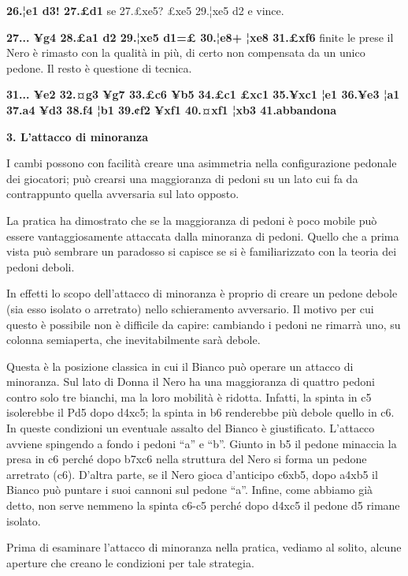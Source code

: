 \textbf{26.¦e1 d3! 27.£d1} se 27.£xe5? £xe5 29.¦xe5 d2 e vince.

\textbf{27... ¥g4 28.£a1 d2 29.¦xe5 d1=£ 30.¦e8+ ¦xe8 31.£xf6} finite le
prese il Nero è rimasto con la qualità in più, di certo non compensata
da un unico pedone. Il resto è questione di tecnica.

\textbf{31... ¥e2 32.¤g3 ¥g7 33.£c6 ¥b5 34.£c1 £xc1 35.¥xc1 ¦e1 36.¥e3
¦a1 37.a4 ¥d3 38.f4 ¦b1 39.¢f2 ¥xf1 40.¤xf1 ¦xb3 41.abbandona}

\textbf{3. L'attacco di minoranza}

I cambi possono con facilità creare una asimmetria nella configurazione
pedonale dei giocatori; può crearsi una maggioranza di pedoni su un lato
cui fa da contrappunto quella avversaria sul lato opposto.

La pratica ha dimostrato che se la maggioranza di pedoni è poco mobile
può essere vantaggiosamente attaccata dalla minoranza di pedoni. Quello
che a prima vista può sembrare un paradosso si capisce se si è
familiarizzato con la teoria dei pedoni deboli.

In effetti lo scopo dell'attacco di minoranza è proprio di creare un
pedone debole (sia esso isolato o arretrato) nello schieramento
avversario. Il motivo per cui questo è possibile non è difficile da
capire: cambiando i pedoni ne rimarrà uno, su colonna semiaperta, che
inevitabilmente sarà debole.


Questa è la posizione classica in cui il Bianco può operare un attacco
di minoranza. Sul lato di Donna il Nero ha una maggioranza di quattro
pedoni contro solo tre bianchi, ma la loro mobilità è ridotta. Infatti,
la spinta in c5 isolerebbe il Pd5 dopo d4xc5; la spinta in b6 renderebbe
più debole quello in c6. In queste condizioni un eventuale assalto del
Bianco è giustificato. L'attacco avviene spingendo a fondo i pedoni
``a'' e ``b''. Giunto in b5 il pedone minaccia la presa in c6 perché
dopo b7xc6 nella struttura del Nero si forma un pedone arretrato (c6).
D'altra parte, se il Nero gioca d'anticipo c6xb5, dopo a4xb5 il Bianco
può puntare i suoi cannoni sul pedone ``a''. Infine, come abbiamo già
detto, non serve nemmeno la spinta c6-c5 perché dopo d4xc5 il pedone d5
rimane isolato.

Prima di esaminare l'attacco di minoranza nella pratica, vediamo al
solito, alcune aperture che creano le condizioni per tale strategia.


